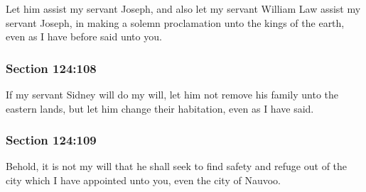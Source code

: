 		Let him assist my servant Joseph, and also let my servant William Law assist my servant Joseph, in making a solemn proclamation unto the kings of the earth, even as I have before said unto you.


	\subsubsection{Section 124:108} %
		\label{DC124-108}

		If my servant Sidney will do my will, let him not remove his family unto the eastern lands, but let him change their habitation, even as I have said.


	\subsubsection{Section 124:109} %
		\label{DC124-109}

		Behold, it is not my will that he shall seek to find safety and refuge out of the city which I have appointed unto you, even the city of Nauvoo.



